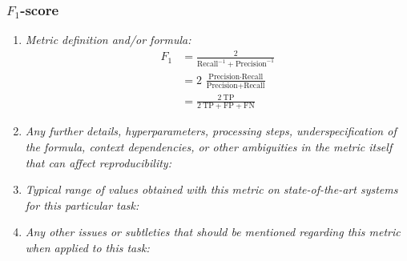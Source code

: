 \documentclass[a4paper,11pt]{article}
\begin{document}
        \subsubsection{$F_1$-score}
            \begin{enumerate}[label=\alph*.]
                \item \textit{Metric definition and/or formula:}
                    \begin{align}
                        F_1 &= \frac{2}{\textrm{Recall}^{-1} + \textrm{Precision}^{-1}}\\
                        &= 2\ \frac{\textrm{Precision} \cdot \textrm{Recall}}{\textrm{Precision} + \textrm{Recall}}\\
                        &= \frac{2\ \textrm{TP}}{2\ \textrm{TP} + \textrm{FP} + \textrm{FN}}
                    \end{align}
                \bigskip
                \item \textit{Any further details, hyperparameters, processing steps, underspecification of the formula, context dependencies, or other ambiguities in the metric itself that can affect reproducibility:}
                \bigskip
                \item \textit{Typical range of values obtained with this metric on state-of-the-art systems for this particular task:}
                \bigskip
                \item \textit{Any other issues or subtleties that should be mentioned regarding this metric when applied to this task:}
                \bigskip
            \end{enumerate}
\end{document}
